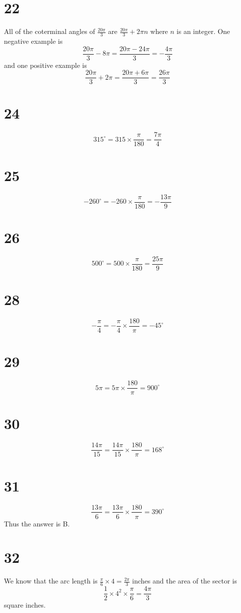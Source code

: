 \documentclass{article}
\theoremstyle{definition}
\newcommand{\?}{\stackrel{?}{=}}
\begin{document}
\section*{22}
All of the coterminal angles of $\frac{20\pi}{3}$ are $\frac{20\pi}{3}+2\pi n$ where $n$ is an integer. One negative example is
\[ \frac{20\pi}{3}-8\pi=\frac{20\pi-24\pi}{3}=-\frac{4\pi}{3} \]
and one positive example is
\[ \frac{20\pi}{3}+2\pi=\frac{20\pi+6\pi}{3}=\frac{26\pi}{3} \]

\section*{24}
\[ 315^\circ=315\times\frac{\pi}{180}=\frac{7\pi}{4} \]

\section*{25}
\[ -260^\circ=-260\times\frac{\pi}{180}=-\frac{13\pi}{9} \]

\section*{26}
\[ 500^\circ=500\times\frac{\pi}{180}=\frac{25\pi}{9} \]

\section*{28}
\[ -\frac{\pi}{4}=-\frac{\pi}{4}\times\frac{180}{\pi}=-45^\circ \]

\section*{29}
\[ 5\pi=5\pi\times\frac{180}{\pi}=900^\circ \]

\section*{30}
\[ \frac{14\pi}{15}=\frac{14\pi}{15}\times\frac{180}{\pi}=168^\circ \]

\section*{31}
\[ \frac{13\pi}{6}=\frac{13\pi}{6}\times\frac{180}{\pi}=390^\circ \] Thus the answer is B.

\section*{32}
We know that the arc length is $\frac{\pi}{6}\times 4=\frac{2\pi}{3}$ inches and the area of the sector is \[ \frac{1}{2}\times 4^2\times\frac{\pi}{6}=\frac{4\pi}{3} \] square inches.
\end{document}
